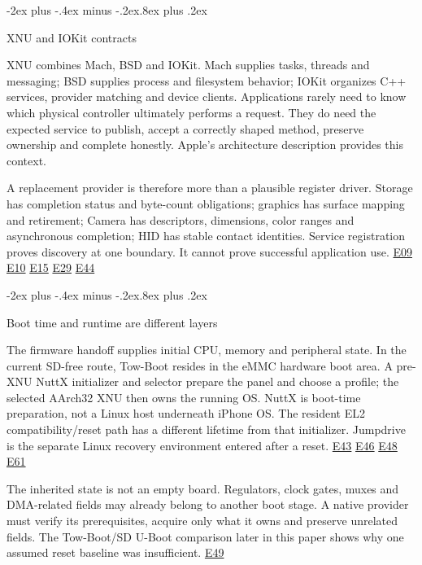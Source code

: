 \documentclass[10pt,letterpaper,twocolumn]{article}
\makeatletter
\renewcommand{\subsection}{\@startsection{subsection}{2}{0pt}
  {-2ex plus -.4ex minus -.2ex}{.8ex plus .2ex}
  {\normalfont\normalsize\bfseries\raggedright}}
\makeatother
\begin{document}
\subsection{XNU and IOKit contracts}

XNU combines Mach, BSD and IOKit. Mach supplies tasks, threads and messaging; BSD supplies process and filesystem behavior; IOKit organizes C++ services, provider matching and device clients. Applications rarely need to know which physical controller ultimately performs a request. They do need the expected service to publish, accept a correctly shaped method, preserve ownership and complete honestly. Apple's architecture description provides this context. \cite{ref-3} \cite{ref-4}

A replacement provider is therefore more than a plausible register driver. Storage has completion status and byte-count obligations; graphics has surface mapping and retirement; Camera has descriptors, dimensions, color ranges and asynchronous completion; HID has stable contact identities. Service registration proves discovery at one boundary. It cannot prove successful application use. \hyperlink{e-E09}{\textsf{E09}} \hyperlink{e-E10}{\textsf{E10}} \hyperlink{e-E15}{\textsf{E15}} \hyperlink{e-E29}{\textsf{E29}} \hyperlink{e-E44}{\textsf{E44}}

\subsection{Boot time and runtime are different layers}

The firmware handoff supplies initial CPU, memory and peripheral state. In the current SD-free route, Tow-Boot resides in the eMMC hardware boot area. A pre-XNU NuttX initializer and selector prepare the panel and choose a profile; the selected AArch32 XNU then owns the running OS. NuttX is boot-time preparation, not a Linux host underneath iPhone OS. The resident EL2 compatibility/reset path has a different lifetime from that initializer. Jumpdrive is the separate Linux recovery environment entered after a reset. \hyperlink{e-E43}{\textsf{E43}} \hyperlink{e-E46}{\textsf{E46}} \hyperlink{e-E48}{\textsf{E48}} \hyperlink{e-E61}{\textsf{E61}}

The inherited state is not an empty board. Regulators, clock gates, muxes and DMA-related fields may already belong to another boot stage. A native provider must verify its prerequisites, acquire only what it owns and preserve unrelated fields. The Tow-Boot/SD U-Boot comparison later in this paper shows why one assumed reset baseline was insufficient. \hyperlink{e-E49}{\textsf{E49}}
\end{document}
